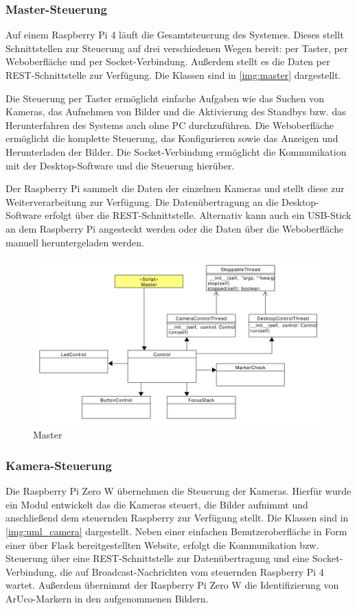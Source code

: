\documentclass[./00PhotoBox.tex]{subfiles}
\begin{document}
\subsubsection{Master-Steuerung}

Auf einem Raspberry Pi 4 läuft die Gesamtsteuerung des Systemes. Dieses stellt Schnittstellen zur Steuerung auf drei verschiedenen Wegen bereit: per Taster, per Weboberfläche und per Socket-Verbindung. Außerdem stellt es die Daten per REST-Schnittstelle zur Verfügung. Die Klassen sind in \autoref{img:master} dargestellt.

Die Steuerung per Taster ermöglicht einfache Aufgaben wie das Suchen von Kameras, das Aufnehmen von Bilder und die Aktivierung des Standbys bzw. das Herunterfahren des Systems auch ohne PC durchzuführen. Die Weboberfläche ermöglicht die komplette Steuerung, das Konfigurieren sowie das Anzeigen und Herunterladen der Bilder. Die Socket-Verbindung ermöglicht die Kommunikation mit der Desktop-Software und die Steuerung hierüber.

Der Raspberry Pi sammelt die Daten der einzelnen Kameras und stellt diese zur Weiterverarbeitung zur Verfügung. Die Datenübertragung an die Desktop-Software erfolgt über die REST-Schnittstelle. Alternativ kann auch ein USB-Stick an dem Raspberry Pi angesteckt werden oder die Daten über die Weboberfläche manuell heruntergeladen werden.

\begin{figure}
    \centering
    \includegraphics[width=1\textwidth]{./img/uml/uml_master_classdiagramm.pdf}
    \caption{Master} %
    \label{img:master} %
\end{figure}


\subsubsection{Kamera-Steuerung}
Die Raspberry Pi Zero W übernehmen die Steuerung der Kameras. Hierfür wurde ein Modul entwickelt das die Kameras steuert, die Bilder aufnimmt und anschließend dem steuernden Raspberry zur Verfügung stellt. Die Klassen sind in \autoref{img:uml_camera} dargestellt. Neben einer einfachen Benutzeroberfläche in Form einer über Flask bereitgestellten Website, erfolgt die Kommunikation bzw. Steuerung über eine REST-Schnittstelle zur Datenübertragung und eine Socket-Verbindung, die auf Broadcast-Nachrichten vom steuernden Raspberry Pi 4 wartet. Außerdem übernimmt der Raspberry Pi Zero W die Identifizierung von ArUco-Markern in den aufgenommenen Bildern.
\end{document}
